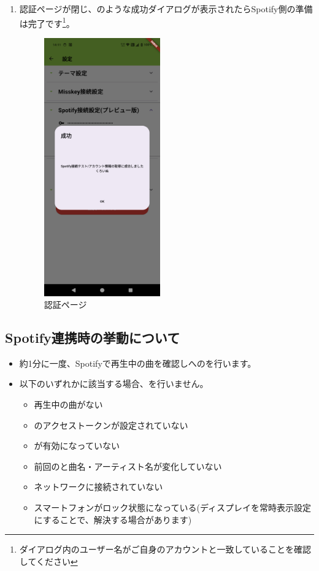 \begin{enumerate}
            \newpage
            \item 認証ページが閉じ、のような成功ダイアログが表示されたらSpotify側の準備は完了です\footnote{ダイアログ内のユーザー名がご自身のアカウントと一致していることを確認してください}。
                \begin{figure}[htbp]
                    \centering
                    \includegraphics[width=5cm]{./pictures/Spotify14.png}
                    \caption{認証ページ}
                    \label{img:spotify14}
                \end{figure}
        \end{enumerate}

    \newpage
    \subsection{Spotify連携時の挙動について}
    \label{sec:spotify7}
    \begin{itemize}
        \item 約1分に一度、Spotifyで再生中の曲を確認し\mi への\nowplaying を行います。
        \item 以下のいずれかに該当する場合、\nowplaying を行いません。
        \begin{itemize}
            \item 再生中の曲がない
            \item \mi のアクセストークンが設定されていない
            \item \nowplaying が有効になっていない
            \item 前回の\nowplaying と曲名・アーティスト名が変化していない
            \item ネットワークに接続されていない
            \item スマートフォンがロック状態になっている(ディスプレイを常時表示設定にすることで、解決する場合があります)
        \end{itemize}
    \end{itemize}
